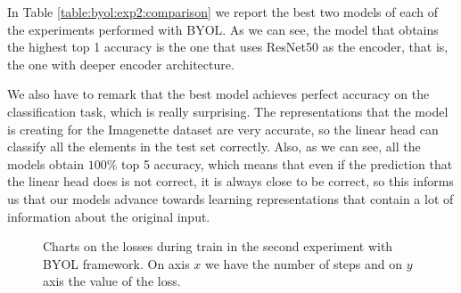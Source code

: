 \begin{table}[H]
    \caption{Results of the best models in both first and second experiments with BYOL.}
    \label{table:byol:exp2:comparison}
    \end{table}

In Table \ref{table:byol:exp2:comparison} we report the best two models of each of the experiments performed with BYOL. As we can see, the model that obtains the highest top 1 accuracy is the one that uses ResNet50 as the encoder, that is, the one with deeper encoder architecture. 

We also have to remark that the best model achieves perfect accuracy on the classification task, which is really surprising. The representations that the model is creating for the Imagenette dataset are very accurate, so the linear head can classify all the elements in the test set correctly. Also, as we can see, all the models obtain $100\%$ top 5 accuracy, which means that even if the prediction that the linear head does is not correct, it is always close to be correct, so this informs us that our models advance towards learning representations that contain a lot of information about the original input.


\begin{figure}[htp] 
    \centering
    \hfill%
        \caption{Charts on the losses during train in the second experiment with BYOL framework. On axis $x$ we have the number of steps and on $y$ axis the value of the loss.}
        \label{fig:byol:exp2:both:losses}
\end{figure}

